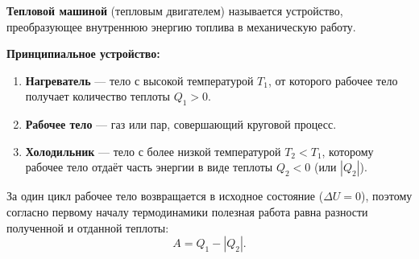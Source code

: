 \begin{definition}
\textbf{Тепловой машиной} (тепловым двигателем) называется устройство, преобразующее внутреннюю энергию топлива в механическую работу.
\par\noindent\textbf{Принципиальное устройство:}
\begin{enumerate}
    \item \textbf{Нагреватель} --- тело с высокой температурой $T_1$, от которого рабочее тело получает количество теплоты $Q_1 > 0$.
    \item \textbf{Рабочее тело} --- газ или пар, совершающий круговой процесс.
    \item \textbf{Холодильник} --- тело с более низкой температурой $T_2 < T_1$, которому рабочее тело отдаёт часть энергии в виде теплоты $Q_2 < 0$ (или $|Q_2|$).
\end{enumerate}
За один цикл рабочее тело возвращается в исходное состояние ($\Delta U = 0$), поэтому согласно первому началу термодинамики полезная работа равна разности полученной и отданной теплоты:
\begin{equation}
    A = Q_1 - |Q_2|. \label{eq:work_cycle_59}
\end{equation}
\end{definition}
